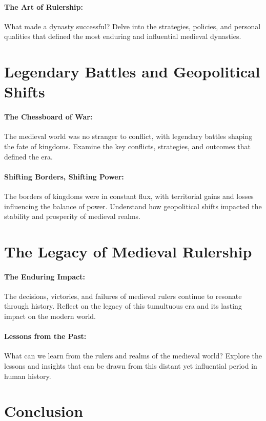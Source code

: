 \documentclass[a4paper,12pt]{book}
\begin{document}
\paragraph{The Art of Rulership:}
What made a dynasty successful? Delve into the strategies, policies, and personal qualities that defined the most enduring and influential medieval dynasties.

\section*{Legendary Battles and Geopolitical Shifts}

\paragraph{The Chessboard of War:}
The medieval world was no stranger to conflict, with legendary battles shaping the fate of kingdoms. Examine the key conflicts, strategies, and outcomes that defined the era.

\paragraph{Shifting Borders, Shifting Power:}
The borders of kingdoms were in constant flux, with territorial gains and losses influencing the balance of power. Understand how geopolitical shifts impacted the stability and prosperity of medieval realms.

\section*{The Legacy of Medieval Rulership}

\paragraph{The Enduring Impact:}
The decisions, victories, and failures of medieval rulers continue to resonate through history. Reflect on the legacy of this tumultuous era and its lasting impact on the modern world.

\paragraph{Lessons from the Past:}
What can we learn from the rulers and realms of the medieval world? Explore the lessons and insights that can be drawn from this distant yet influential period in human history.

\section*{Conclusion}
\end{document}

